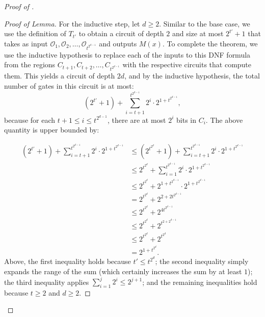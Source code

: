 \documentclass[10pt,a4paper]{article}
\begin{document}
\begin{proof}[Proof of ]
\begin{proof}[Proof of Lemma]
For the inductive step, let $d \ge 2$. Similar to the base case, we use the definition of $T_{t'}$ to obtain a circuit of depth $2$ and size at most $2^{t'} + 1$ that takes as input $\mathcal{O}_1,\mathcal{O}_2,\ldots,\mathcal{O}_{t^{2^{d-1}}}$ and outputs $M(x)$. To complete the theorem, we use the inductive hypothesis to replace each of the inputs to this DNF formula from the regions $C_{t+1},C_{t+2},\ldots,C_{t^{2^{d-1}}}$ with the respective circuits that compute them. This yields a circuit of depth $2d$, and by the inductive hypothesis, the total number of gates in this circuit is at most:
\[
\left(2^{t'} + 1\right) + \sum_{i=t+1}^{t^{2^{d-1}}} 2^{i} \cdot 2^{1 + t^{2^{d-1}}},
\]
because for each $t+1 \le i \le t^{2^{d-1}}$, there are at most $2^i$ bits in $C_i$. The above quantity is upper bounded by:

\begin{align*}
\left(2^{t'} + 1\right) + \sum_{i=t+1}^{t^{2^{d-1}}} 2^{i} \cdot 2^{1 + t^{2^{d-1}}}
&\le \left(2^{t^{2^d}} + 1\right) + \sum_{i=t+1}^{t^{2^{d-1}}} 2^{i} \cdot 2^{1 + t^{2^{d-1}}}\\
&\le 2^{t^{2^d}} + \sum_{i=1}^{t^{2^{d-1}}} 2^{i} \cdot 2^{1 + t^{2^{d-1}}}\\
&\le 2^{t^{2^d}} + 2^{1 + t^{2^{d-1}}} \cdot 2^{1 + t^{2^{d-1}}}\\
&= 2^{t^{2^d}} + 2^{2 + 2t^{2^{d-1}}}\\
&\le 2^{t^{2^d}} + 2^{4t^{2^{d-1}}}\\
&\le 2^{t^{2^d}} + 2^{t^{2 + 2^{d-1}}}\\
&\le 2^{t^{2^d}} + 2^{t^{2^d}}\\
&= 2^{1 + t^{2^d}}.
\end{align*}
Above, the first inequality holds because $t' \le t^{2^d}$; the second inequality simply expands the range of the sum (which certainly increases the sum by at least $1$); the third inequality applies $\sum_{i=1}^j 2^i \le 2^{j+1}$; and the remaining inequalities hold because $t \ge 2$ and $d \ge 2$.
\end{proof}



\end{proof}
\end{document}
